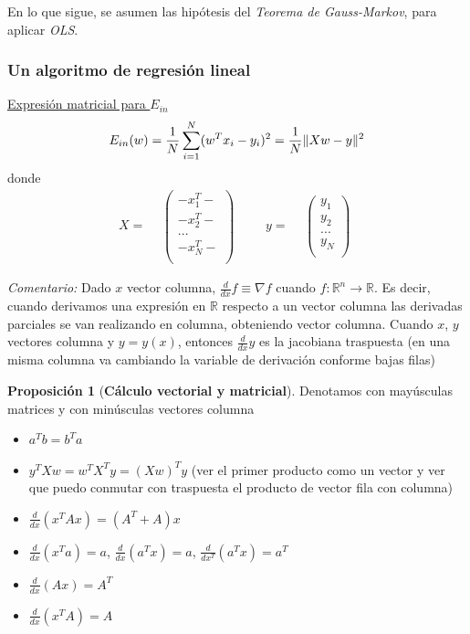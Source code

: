 \documentclass[11pt,a4paper]{article}
\DeclarePairedDelimiter{\norm}{\lVert}{\rVert}
\theoremstyle{definition}
\newtheorem{proposition}{Proposición}[section]
\newcommand{\R}{\mathbb{R}}
\begin{document}
	En lo que sigue, se asumen las hipótesis del \textit{Teorema de Gauss-Markov}, para aplicar \textit{OLS}.
	
	\subsubsection{Un algoritmo de regresión lineal}
	
	\underline{Expresión matricial para $E_{in}$}
	$$E_{in}(w)=\frac{1}{N} \sum_{i=1}^N (w^Tx_i -y_i)^2=\frac{1}{N}\norm{Xw-y}^2$$
	donde
	$$
	X=\begin{matrix}
	& \left(\begin{matrix}
	- x_1^T - \\
	- x_2^T - \\
	...  \\
	- x_N^T - \\
	\end{matrix}\right)
	\end{matrix}
		\quad \quad 
	y=\begin{matrix}
	& \left(\begin{matrix}
	y_1 \\
	y_2 \\
	...  \\
	y_N  \\
	\end{matrix}\right)
	\end{matrix}
	$$
	
		\textit{Comentario:} Dado $x$ vector columna, $\frac{d}{dx} f \equiv \nabla f$ cuando $f\colon \R^n \to \R$. Es decir, cuando derivamos una expresión en $\R$ respecto a un vector columna las derivadas parciales se van realizando en columna, obteniendo vector columna. Cuando $x$, $y$ vectores columna y $y=y(x)$, entonces $\frac{d}{dx} y$ es la jacobiana traspuesta (en una misma columna va cambiando la variable de derivación conforme bajas filas)

	\begin{proposition}[\textbf{Cálculo vectorial y matricial}]
	Denotamos con mayúsculas matrices y con minúsculas vectores columna
	\begin{itemize}
		\item $a^Tb=b^Ta$
		\item $y^TXw=w^TX^Ty=(Xw)^Ty$ (ver el primer producto como un vector y ver que puedo conmutar con traspuesta el producto de vector fila con columna)
		\item $\frac{d}{dx}(x^TAx)=(A^T+A)x$
		\item $\frac{d}{dx} (x^Ta)=a$, $\frac{d}{dx} (a^Tx)=a$, $\frac{d}{dx^T} (a^Tx)=a^T$
		\item $\frac{d}{dx} (Ax)=A^T$%
		\item $\frac{d}{dx} (x^TA)=A$%
	\end{itemize}
	\end{proposition}
	
\end{document}

